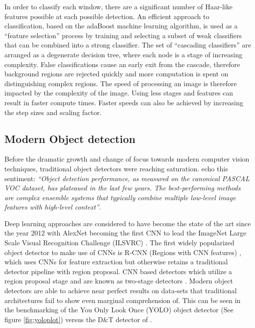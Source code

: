 \documentclass[a4paper,twoside,12pt]{report}
\begin{document}
In order to classify each window, there are a significant number of Haar-like features possible at each possible detection. An efficient approach to classification, based on the adaBoost machine learning algorithm, is used as a ``feature selection'' process by training and selecting a subset of weak classifiers that can be combined into a strong classifier. The set of ``cascading classifiers'' are arranged as a degenerate decision tree, where each node is a stage of increasing complexity. False classifications cause an early exit from the cascade, therefore background regions are rejected quickly and more computation is spent on distinguishing complex regions. The speed of processing an image is therefore impacted by the complexity of the image. Using less stages and features can result in faster compute times. Faster speeds can also be achieved by increasing the step sizes and scaling factor.

\newpage
\subsection{Modern Object detection}

Before the dramatic growth and change of focus towards modern computer vision techniques, traditional object detectors were reaching saturation. \citep{rcnn} echo this sentiment: \textit{``Object detection performance, as measured on the canonical PASCAL VOC dataset, has plateaued in the last few years. The best-performing methods are complex ensemble systems that typically combine multiple low-level image features with high-level context''}.

Deep learning approaches are considered to have become the state of the art since the year 2012 with AlexNet becoming the first CNN to lead the ImageNet Large Scale Visual Recognition Challenge (ILSVRC) \citep{alexnet}. The first widely popularized object detector to make use of CNNs is R-CNN (Regions with CNN features) \citep{rcnn}, which uses CNNs for feature extraction but otherwise retains a traditional detector pipeline with region proposal. CNN based detectors which utilize a region proposal stage and are known as two-stage detectors \citep{comprehensive}.  Modern object detectors are able to achieve near perfect results on data-sets that traditional architectures fail to show even marginal comprehension of. This can be seen in the benchmarking of the You Only Look Once (YOLO) object detector (See figure \ref{fig:yoloplot}) \citep{yolo} versus the D\&T detector of \cite{hog}.
\end{document}
